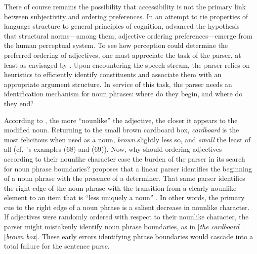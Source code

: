 \documentclass{sp}
\begin{document}
There of course remains the possibility that accessibility is not the primary link between subjectivity and ordering preferences. In an attempt to tie properties of language structure to general principles of cognition, \cite{bever1970} advanced the hypothesis that structural norms---among them, adjective ordering preferences---emerge from the human perceptual system. To see how perception could determine the preferred ordering of adjectives, one must appreciate the task of the parser, at least as envisaged by \citeauthor{bever1970}. Upon encountering the speech stream, the parser relies on heuristics to efficiently identify constituents and associate them with an appropriate argument structure. In service of this task, the parser needs an identification mechanism for noun phrases: where do they begin, and where do they end? 

According to \citeauthor{bever1970}, the more ``nounlike'' the adjective, the closer it appears to the modified noun. %
Returning to the small brown cardboard box, \emph{cardboard} is the most felicitous when used as a noun, \emph{brown} slightly less so, and \emph{small} the least of all (cf.~\citeauthor{bever1970}'s examples (68) and (69)). 
%
%
%
Now, why should ordering adjectives according to their nounlike character ease the burden of the parser in its search for noun phrase boundaries? \citeauthor{bever1970} proposes that a linear parser identifies the beginning of a noun phrase with the presence of a determiner. That same parser identifies the right edge of the noun phrase with the transition from a clearly nounlike element to an item that is ``less uniquely a noun'' . In other words, the primary cue to the right edge of a noun phrase is a salient decrease in nounlike character. If adjectives were randomly ordered with respect to their nounlike character, the parser might mistakenly identify noun phrase boundaries, as in [\emph{the cardboard}] [\emph{brown box}]. These early errors identifying phrase boundaries would cascade into a total failure for the sentence parse.
\end{document}
